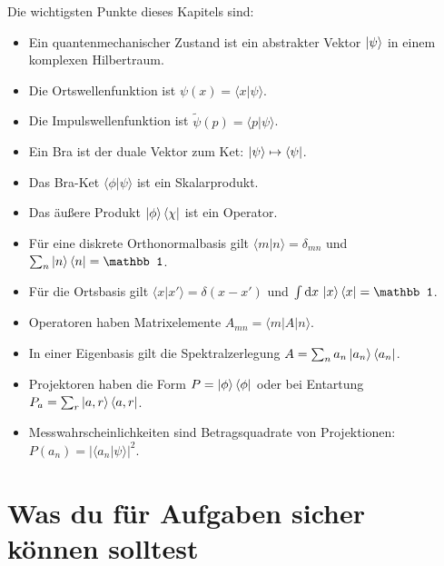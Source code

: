 \begin{conceptbox}
Die wichtigsten Punkte dieses Kapitels sind:
\begin{itemize}
    \item Ein quantenmechanischer Zustand ist ein abstrakter Vektor $\left|\psi\right\rangle$ in einem komplexen Hilbertraum.
    \item Die Ortswellenfunktion ist $\psi(x)=\langle x|\psi\rangle$.
    \item Die Impulswellenfunktion ist $\tilde\psi(p)=\langle p|\psi\rangle$.
    \item Ein Bra ist der duale Vektor zum Ket: $\left|\psi\right\rangle\mapsto\left\langle\psi\right|$.
    \item Das Bra-Ket $\langle\phi|\psi\rangle$ ist ein Skalarprodukt.
    \item Das äußere Produkt $\left|\phi\right\rangle\left\langle\chi\right|$ ist ein Operator.
    \item Für eine diskrete Orthonormalbasis gilt $\langle m|n\rangle=\delta_{mn}$ und $\sum_n\ket n\bra n=\mathbb 1$.
    \item Für die Ortsbasis gilt $\langle x|x'\rangle=\delta(x-x')$ und $\int\dd x\,\ket x\bra x=\mathbb 1$.
    \item Operatoren haben Matrixelemente $A_{mn}=\langle m|A|n\rangle$.
    \item In einer Eigenbasis gilt die Spektralzerlegung $A=\sum_n a_n\left|a_n\right\rangle\left\langle a_n\right|$.
    \item Projektoren haben die Form $P=\left|\phi\right\rangle\left\langle\phi\right|$ oder bei Entartung $P_a=\sum_r\left|a,r\right\rangle\left\langle a,r\right|$.
    \item Messwahrscheinlichkeiten sind Betragsquadrate von Projektionen: $P(a_n)=|\langle a_n|\psi\rangle|^2$.
\end{itemize}
\end{conceptbox}

\section{Was du für Aufgaben sicher können solltest}

